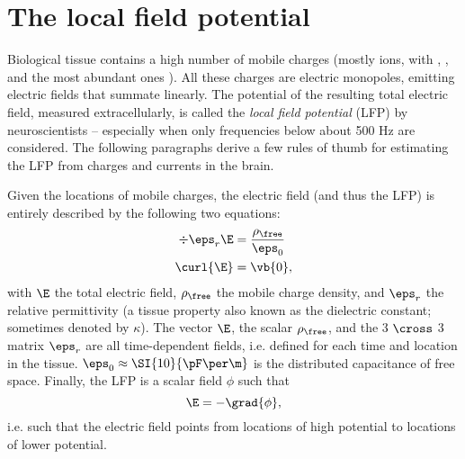 \section{The local field potential}
\label{sec:LFP}

Biological tissue contains a high number of mobile charges (mostly ions, with , , and  the most abundant ones \cite{Martinsen2015a}). All these charges are electric monopoles, emitting electric fields that summate linearly. The potential of the resulting total electric field, measured extracellularly, is called the \emph{local field potential} (LFP) by neuroscientists -- especially when only frequencies below about 500 Hz are considered. The following paragraphs derive a few rules of thumb for estimating the LFP from charges and currents in the brain.

Given the locations of mobile charges, the electric field (and thus the LFP) is entirely described by the following two equations:\footnotemark{}
%
\begin{align}
\div{\eps_r \E}  &= \frac{\rho_\free}{\eps_0}   \label{eq:gauss} \\
\curl{\E}        &= \vb{0},                     \label{eq:irrot}
\end{align}
%
with $\E$ the total electric field, $\rho_\free$ the mobile charge density, and $\eps_r$ the relative permittivity (a tissue property also known as the dielectric constant; sometimes denoted by $\kappa$). The vector $\E$, the scalar $\rho_\free$, and the 3 $\cross$ 3 matrix $\eps_r$ are all time-dependent fields, i.e. defined for each time and location in the tissue. $\eps_0 \approx \SI{10}{\pF\per\m}$ is the distributed capacitance of free space. Finally, the LFP is a scalar field $\phi$ such that
%
\begin{equation}
\label{eq:potential}
\E = -\grad{\phi},
\end{equation}
%
i.e. such that the electric field points from locations of high potential to locations of lower potential.



